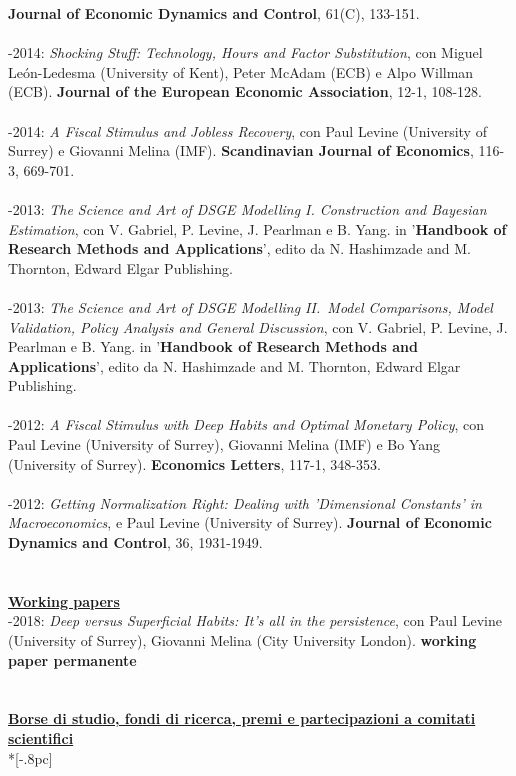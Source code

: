 \documentclass[10p]{article}
\begin{document}
\textbf{Journal of Economic Dynamics and Control}, 61(C), 133-151.\\
\\
-2014: \emph{Shocking Stuff: Technology, Hours and Factor Substitution}, con Miguel Le\'{o}n-Ledesma (University of Kent), Peter McAdam (ECB) e Alpo Willman (ECB). 
\textbf{Journal of the European Economic Association}, 12-1, 108-128.\\
\\
-2014: \emph{A Fiscal Stimulus and Jobless Recovery}, con  Paul Levine (University of Surrey) e Giovanni Melina (IMF). \textbf{Scandinavian Journal of Economics}, 116-3, 669-701.\\
\\
-2013: \emph{The Science and  Art of DSGE Modelling I. Construction and Bayesian Estimation}, con V. Gabriel,  P. Levine, J. Pearlman e B. Yang.   in  '\textbf{Handbook of Research Methods and Applications}', edito da N. Hashimzade and M. Thornton,  Edward Elgar Publishing.\\
\\
-2013: \emph{The Science and  Art of DSGE Modelling  II.~Model Comparisons, Model Validation, Policy Analysis and General Discussion}, con V. Gabriel,  P. Levine, J. Pearlman e B. Yang. in  '\textbf{Handbook of Research Methods and Applications}', edito da N. Hashimzade and M. Thornton,  Edward Elgar Publishing.\\
\\
-2012: \emph{A Fiscal Stimulus with Deep Habits and Optimal Monetary Policy}, con Paul Levine (University of Surrey), Giovanni Melina (IMF) e Bo Yang (University of Surrey). \textbf{Economics Letters}, 117-1, 348-353.\\
\\
-2012: \emph{Getting Normalization Right: Dealing with 'Dimensional Constants' in Macroeconomics}, e Paul Levine (University of Surrey). \textbf{Journal of Economic Dynamics and Control},  36, 1931-1949.\\
\\
\\
{\bf \underline{Working papers}} \\
-2018: \emph{Deep versus Superficial Habits: It's all in the persistence}, con  Paul Levine (University of Surrey), Giovanni Melina (City University London). \textbf{working paper permanente}\\
\\
\\
{\bf \underline{Borse di studio, fondi di ricerca, premi e partecipazioni a comitati scientifici}}  \\*[-.8pc]
\end{document}
